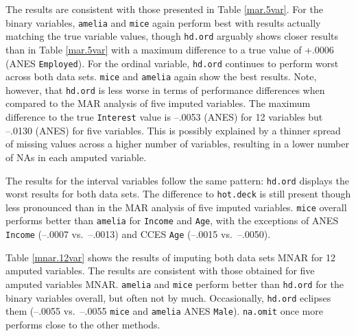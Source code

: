 \documentclass[12pt,econ]{sources/authesis}
\begin{document}
The results are consistent with those presented in Table \ref{mar.5var}. For the binary variables, \texttt{amelia} and \texttt{mice} again perform best with results actually matching the true variable values, though \texttt{hd.ord} arguably shows closer results than in Table \ref{mar.5var} with a maximum difference to a true value of +.0006 (ANES \texttt{Employed}). For the ordinal variable, \texttt{hd.ord} continues to perform worst across both data sets. \texttt{mice} and \texttt{amelia} again show the best results. Note, however, that \texttt{hd.ord} is less worse in terms of performance differences when compared to the MAR analysis of five imputed variables. The maximum difference to the true \texttt{Interest} value is --.0053 (ANES) for 12 variables but --.0130 (ANES) for five variables. This is possibly explained by a thinner spread of missing values across a higher number of variables, resulting in a lower number of NAs in each amputed variable.

The results for the interval variables follow the same pattern: \texttt{hd.ord} displays the worst results for both data sets. The difference to \texttt{hot.deck} is still present though less pronounced than in the MAR analysis of five imputed variables. \texttt{mice} overall performs better than \texttt{amelia} for \texttt{Income} and \texttt{Age}, with the exceptions of ANES \texttt{Income} (--.0007 vs.~--.0013) and CCES \texttt{Age} (--.0015 vs.~--.0050).

Table \ref{mnar.12var} shows the results of imputing both data sets MNAR for 12 amputed variables. The results are consistent with those obtained for five amputed variables MNAR. \texttt{amelia} and \texttt{mice} perform better than \texttt{hd.ord} for the binary variables overall, but often not by much. Occasionally, \texttt{hd.ord} eclipses them (--.0055 vs.~--.0055 \texttt{mice} and \texttt{amelia} ANES \texttt{Male}). \texttt{na.omit} once more performs close to the other methods.

\ssp
\end{document}
